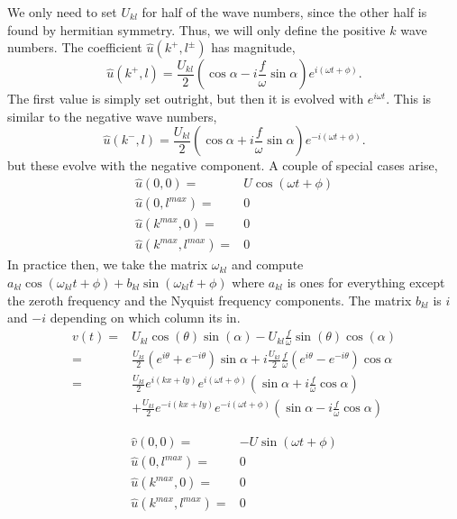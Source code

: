 \documentclass[11pt]{article}
\begin{document}
We only need to set $U_{kl}$ for half of the wave numbers, since the other half is found by hermitian symmetry. Thus, we will only define the positive $k$ wave numbers. The coefficient $\hat{u}(k^+,l^\pm)$ has magnitude,
\begin{equation}
\hat{u}(k^+,l) = \frac{U_{kl}}{2} \left( \cos \alpha - i \frac{f}{\omega} \sin \alpha \right) e^{i (\omega t + \phi)}.
\end{equation}
The first value is simply set outright, but then it is evolved with $e^{i \omega t}$. This is similar to the negative wave numbers, 
\begin{equation}
\hat{u}(k^-,l) = \frac{U_{kl}}{2} \left( \cos \alpha + i \frac{f}{\omega} \sin \alpha \right) e^{-i (\omega t + \phi)}.
\end{equation}
but these evolve with the negative component.
A couple of special cases arise,
\begin{align}
\hat{u}(0,0) =& U \cos( \omega t + \phi) \\
\hat{u}(0,l^{max}) =& 0 \\
\hat{u}(k^{max},0) =& 0 \\
\hat{u}(k^{max},l^{max}) = & 0
\end{align}
In practice then, we take the matrix $\omega_{kl}$ and compute $ a_{kl} \cos( \omega_{kl} t + \phi) + b_{kl} \sin( \omega_{kl} t + \phi)$ where $a_{kl}$ is ones for everything except the zeroth frequency and the Nyquist frequency components. The matrix $b_{kl}$ is $i$ and $-i$ depending on which column its in.
\begin{align}
v(t) =& U_{kl} \cos( \theta ) \sin( \alpha) - U_{kl} \frac{f}{\omega} \sin( \theta ) \cos(\alpha) \\
=& \frac{U_{kl}}{2} \left( e^{i\theta} + e^{-i \theta} \right) \sin \alpha + i \frac{U_{kl}}{2} \frac{f}{\omega} \left( e^{i \theta} - e^{-i\theta} \right) \cos \alpha \\
=& \frac{U_{kl}}{2} e^{i(kx+ly)} e^{i(\omega t + \phi)} \left( \sin \alpha + i \frac{f}{\omega} \cos \alpha \right)  \\ \nonumber
&+ \frac{U_{kl}}{2} e^{-i(kx+ly)} e^{-i(\omega t + \phi)} \left( \sin \alpha - i \frac{f}{\omega} \cos \alpha \right) 
\end{align}

\begin{align}
\hat{v}(0,0) =& - U \sin( \omega t + \phi) \\
\hat{u}(0,l^{max}) =& 0 \\
\hat{u}(k^{max},0) =& 0 \\
\hat{u}(k^{max},l^{max}) = & 0
\end{align}
\end{document}
